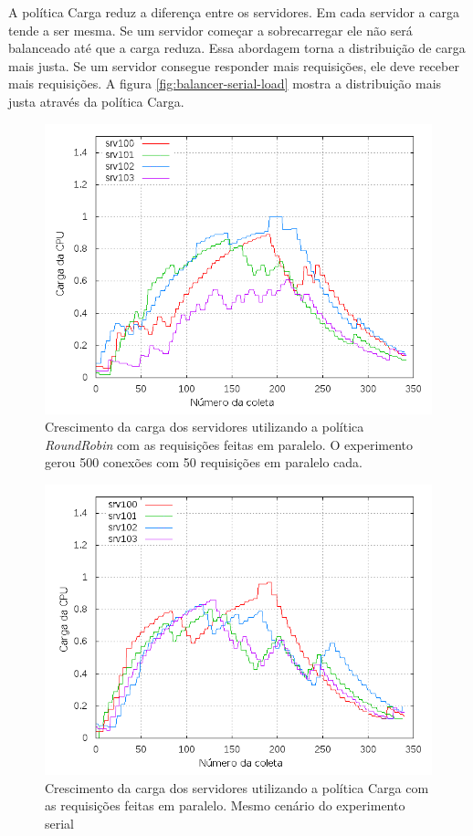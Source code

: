 A política Carga reduz a diferença entre os servidores.
Em cada servidor a carga tende a ser mesma.
Se um servidor começar a sobrecarregar ele não será balanceado até que a 
carga reduza. 
Essa abordagem torna a distribuição de carga mais justa.
Se um servidor consegue responder mais requisições, ele 
deve receber mais requisições.
A figura \ref{fig:balancer-serial-load} mostra a distribuição mais justa 
através da política Carga.

\begin{figure}[htb!]
    \centering
    \includegraphics[scale=0.5]{img/balancer-parallel-rr}
    \caption{Crescimento da carga dos servidores utilizando a política 
    \emph{RoundRobin} com as requisições feitas em paralelo. O experimento
    gerou 500 conexões com 50 requisições em paralelo cada.}
    \label{fig:balancer-parallel-rr}
\end{figure}

\begin{figure}[htb!]
    \centering
    \includegraphics[scale=0.5]{img/balancer-parallel-load}
    \caption{Crescimento da carga dos servidores utilizando a política Carga
    com as requisições feitas em paralelo. Mesmo cenário do experimento serial}
    \label{fig:balancer-parallel-load}
\end{figure}

